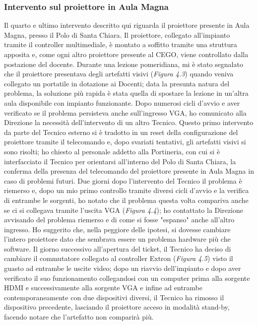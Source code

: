             \subsubsection{Intervento sul proiettore in Aula Magna}
                    Il quarto e ultimo intervento descritto qui riguarda il proiettore presente in Aula Magna, presso il Polo di Santa Chiara. Il proiettore, collegato all'impianto tramite il controller multimediale, è montato a soffitto tramite una struttura apposita e, come ogni altro proiettore presente al CEGO, viene controllato dalla postazione del docente. \newline
                    Durante una lezione pomeridiana, mi è stato segnalato che il proiettore presentava degli artefatti visivi (\textit{Figura 4.3}) quando veniva collegato un portatile in dotazione ai Docenti; data la presunta natura del problema, la soluzione più rapida è stata quella di spostare la lezione in un'altra aula disponibile con impianto funzionante. Dopo numerosi cicli d'avvio e aver verificato se il problema persisteva anche sull'ingresso VGA, ho comunicato alla Direzione la necessità dell'intervento di un altro Tecnico. \newline
                    Questo primo intervento da parte del Tecnico esterno si è tradotto in un reset della configurazione del proiettore tramite il telecomando e, dopo svariati tentativi, gli artefatti visivi si sono risolti; ho chiesto al personale addetto alla Portineria, con cui si è interfacciato il Tecnico per orientarsi all'interno del Polo di Santa Chiara, la conferma della presenza del telecomando del proiettore presente in Aula Magna in caso di problemi futuri. \newline
                    Due giorni dopo l'intervento del Tecnico il problema è riemerso e, dopo un mio primo controllo tramite diversi cicli d'avvio e la verifica di entrambe le sorgenti, ho notato che il problema questa volta compariva anche se ci si collegava tramite l'uscita VGA (\textit{Figura 4.4}); ho contattato la Direzione avvisando del problema riemerso e di come si fosse "espanso" anche all'altro ingresso. Ho suggerito che, nella peggiore delle ipotesi, si dovesse cambiare l'intero proiettore dato che sembrava essere un problema hardware più che software. Il giorno successivo all'apertura del ticket, il Tecnico ha deciso di cambiare il commutatore collegato al controller Extron (\textit{Figura 4.5}) visto il guasto ad entrambe le uscite video; dopo un riavvio dell'impianto e dopo aver verificato il suo funzionamento collegandosi con un computer prima alla sorgente HDMI e successivamente alla sorgente VGA e infine ad entrambe contemporaneamente con due dispositivi diversi, il Tecnico ha rimosso il dispositivo precedente, lasciando il proiettore acceso in modalità stand-by, facendo notare che l'artefatto non comparirà più. 


